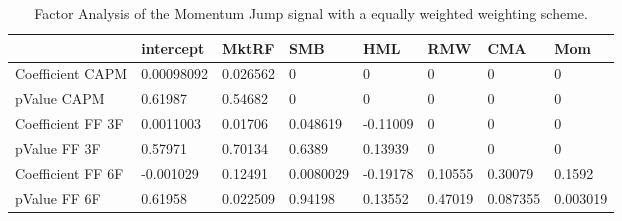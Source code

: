 \begin{table}[H]
\centering
\begin{tabular}{llllllll}
\hline& intercept & MktRF & SMB & HML & RMW & CMA & Mom \\ 
\hline 
Coefficient CAPM & 0.00098092 & 0.026562 & 0 & 0 & 0 & 0 & 0 \\ 
pValue CAPM & 0.61987 & 0.54682 & 0 & 0 & 0 & 0 & 0 \\ 
Coefficient FF 3F & 0.0011003 & 0.01706 & 0.048619 & -0.11009 & 0 & 0 & 0 \\ 
pValue FF 3F & 0.57971 & 0.70134 & 0.6389 & 0.13939 & 0 & 0 & 0 \\ 
Coefficient FF 6F & -0.001029 & 0.12491 & 0.0080029 & -0.19178 & 0.10555 & 0.30079 & 0.1592 \\ 
pValue FF 6F & 0.61958 & 0.022509 & 0.94198 & 0.13552 & 0.47019 & 0.087355 & 0.003019 \\ 
\hline
\end{tabular}
\caption{Factor Analysis of the Momentum Jump signal with a equally weighted weighting scheme.}
\label{MOMJUMPEW_FACTOR}
\end{table}